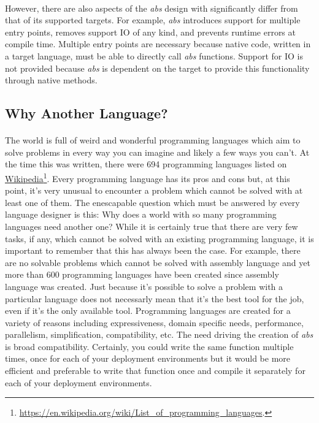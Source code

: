 \documentclass[hidelinks]{article}
\begin{document}
\paragraph{}However, there are also aspects of the \textit{abs} design with significantly differ from that of its supported targets. For example, \textit{abs} introduces support for multiple entry points, removes support IO of any kind, and prevents runtime errors at compile time. Multiple entry points are necessary because native code, written in a target language, must be able to directly call \textit{abs} functions. Support for IO is not provided because \textit{abs} is dependent on the target to provide this functionality through native methods.  


\subsection{Why Another Language?}
\paragraph{}
The world is full of weird and wonderful programming languages which aim to solve problems in every way you can imagine and likely a few ways you can't. At the time this was written, there were 694 programming languages listed on \href{https://en.wikipedia.org/wiki/List_of_programming_languages}{{\color{blue}Wikipedia}}\footnote{\url{https://en.wikipedia.org/wiki/List_of_programming_languages}.}. Every programming language has its pros and cons but, at this point, it's very unusual to encounter a problem which cannot be solved with at least one of them. The enescapable question which must be answered by every language designer is this: Why does a world with so many programming languages need another one? While it is certainly true that there are very few tasks, if any, which cannot be solved with an existing programming language, it is important to remember that this has always been the case. For example, there are no solvable problems which cannot be solved with assembly language and yet more than 600 programming languages have been created since assembly language was created. Just because it's possible to solve a problem with a particular language does not necessarly mean that it's the best tool for the job, even if it's the only available tool. Programming languages are created for a variety of reasons including expressiveness, domain specific needs, performance, parallelism, simplification, compatibility, etc. The need driving the creation of \textit{abs} is broad compatibility. Certainly, you could write the same function multiple times, once for each of your deployment environments but it would be more efficient and preferable to write that function once and compile it separately for each of your deployment environments.
\end{document}
